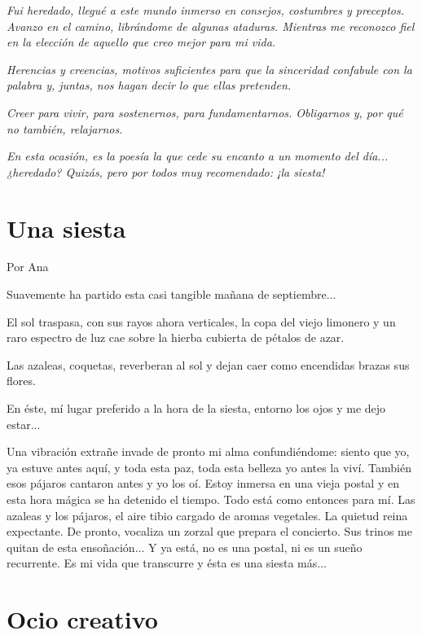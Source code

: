 \documentclass[11pt,twoside,openright,a5paper]{book}
\begin{document}
\vspace{0.5cm}
\emph{Fui heredado, llegué a este mundo inmerso en consejos, costumbres y preceptos. Avanzo en el camino, librándome de algunas ataduras. Mientras me reconozco fiel en la elección de aquello que creo mejor para mi vida.}

\emph{Herencias y creencias, motivos suficientes para que la sinceridad confabule con la palabra y, juntas, nos hagan decir lo que ellas pretenden.}

\emph{Creer para vivir, para sostenernos, para fundamentarnos. Obligarnos y, por qué no también, relajarnos.}

\emph{En esta ocasión, es la poesía la que cede su encanto a un momento del día... ¿heredado? Quizás, pero por todos muy recomendado: ¡la siesta!}

\section*{Una siesta}
                                                                                                             \begin{flushright}Por Ana\end{flushright}

Suavemente ha partido esta casi tangible mañana de septiembre...

El sol traspasa, con sus rayos ahora verticales, la copa del viejo limonero y un raro espectro de luz cae sobre la hierba cubierta de pétalos de azar.

Las azaleas, coquetas, reverberan al sol y dejan caer como encendidas brazas sus flores.

En éste, mí lugar preferido a la hora de la siesta, entorno los ojos y me dejo estar...

Una vibración extrañe invade de pronto mi alma confundiéndome: siento que yo, ya estuve antes aquí, y toda esta paz, toda esta belleza yo antes la viví. También esos pájaros cantaron antes y yo los oí. Estoy inmersa en una vieja postal y en esta hora mágica se ha detenido el tiempo. Todo está como entonces para mí. Las azaleas y los pájaros, el aire tibio cargado de aromas vegetales. La quietud reina expectante. De pronto, vocaliza un zorzal que prepara el concierto. Sus trinos me quitan de esta ensoñación...
Y ya está, no es una postal, ni es un sueño recurrente. Es mi vida que transcurre y ésta es una siesta más...

\section*{Ocio creativo}
\end{document}
